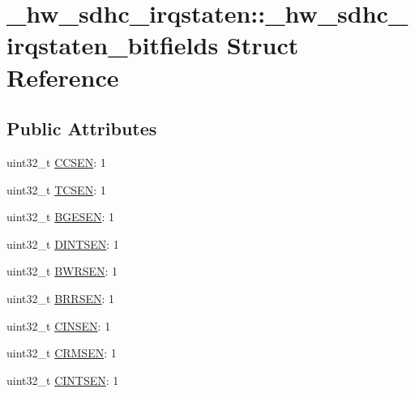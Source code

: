 \hypertarget{struct__hw__sdhc__irqstaten_1_1__hw__sdhc__irqstaten__bitfields}{}\section{\+\_\+hw\+\_\+sdhc\+\_\+irqstaten\+:\+:\+\_\+hw\+\_\+sdhc\+\_\+irqstaten\+\_\+bitfields Struct Reference}
\label{struct__hw__sdhc__irqstaten_1_1__hw__sdhc__irqstaten__bitfields}
\subsection*{Public Attributes}
\begin{DoxyCompactItemize}
\item 
uint32\+\_\+t \hyperlink{struct__hw__sdhc__irqstaten_1_1__hw__sdhc__irqstaten__bitfields_aad869652cb109f25b6666c4e80f29e0a}{C\+C\+S\+EN}\+: 1
\item 
uint32\+\_\+t \hyperlink{struct__hw__sdhc__irqstaten_1_1__hw__sdhc__irqstaten__bitfields_ab6a1e43a81cb8354baa75af2fc7a3df1}{T\+C\+S\+EN}\+: 1
\item 
uint32\+\_\+t \hyperlink{struct__hw__sdhc__irqstaten_1_1__hw__sdhc__irqstaten__bitfields_af9e859beff5c409bdfd798fb0ed7df60}{B\+G\+E\+S\+EN}\+: 1
\item 
uint32\+\_\+t \hyperlink{struct__hw__sdhc__irqstaten_1_1__hw__sdhc__irqstaten__bitfields_a552f6ae16008cc1c5c21f973a81eb0b1}{D\+I\+N\+T\+S\+EN}\+: 1
\item 
uint32\+\_\+t \hyperlink{struct__hw__sdhc__irqstaten_1_1__hw__sdhc__irqstaten__bitfields_ab35c8e1e1c884a50eaa9682e9b177d6d}{B\+W\+R\+S\+EN}\+: 1
\item 
uint32\+\_\+t \hyperlink{struct__hw__sdhc__irqstaten_1_1__hw__sdhc__irqstaten__bitfields_ac75552ba82372ba998a4ae7e3392b9ae}{B\+R\+R\+S\+EN}\+: 1
\item 
uint32\+\_\+t \hyperlink{struct__hw__sdhc__irqstaten_1_1__hw__sdhc__irqstaten__bitfields_a857a3a923226c216a2e489bb138e20b0}{C\+I\+N\+S\+EN}\+: 1
\item 
uint32\+\_\+t \hyperlink{struct__hw__sdhc__irqstaten_1_1__hw__sdhc__irqstaten__bitfields_af1aae8b4299592b2ec5adddc8f77d601}{C\+R\+M\+S\+EN}\+: 1
\item 
uint32\+\_\+t \hyperlink{struct__hw__sdhc__irqstaten_1_1__hw__sdhc__irqstaten__bitfields_acf88169101cf58b9575a98adc0aff321}{C\+I\+N\+T\+S\+EN}\+: 1
\item 

\end{DoxyCompactItemize}
